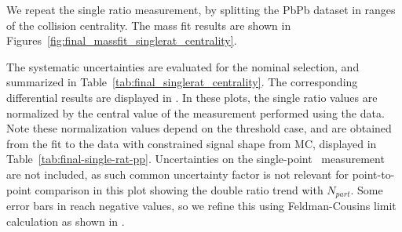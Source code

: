 We repeat the single ratio measurement, by splitting the PbPb dataset in ranges of the collision centrality. 
The mass fit results are shown in Figures~\ref{fig:final_massfit_singlerat_centrality}.

The systematic uncertainties are evaluated for the nominal selection, and summarized in Table~\ref{tab:final_singlerat_centrality}. The corresponding differential results are displayed in . In these plots, the single ratio values are normalized by the central value of the measurement performed using the \Pp\Pp{} data. Note these normalization values depend on the \pt{} threshold case, and are obtained from the fit to the \Pp\Pp{} data with constrained signal shape from MC, displayed in Table~\ref{tab:final-single-rat-pp}. 
 Uncertainties on the single-point \Pp\Pp~measurement are not included, as such common uncertainty factor is not relevant for point-to-point comparison in this plot showing the double ratio trend with $N_{part}$. Some error bars in  reach negative values, so we refine this using Feldman-Cousins limit calculation as shown in . 

